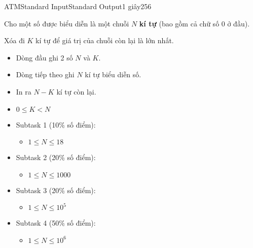 \documentclass[11pt,a4paper,oneside]{article}
\begin{document}
\begin{problem}{ATM}{Standard Input}{Standard Output}{1 giây}{256}

Cho một số được biểu diễn là một chuỗi $N$ \textbf{kí tự} (bao gồm cả chữ số 0 ở đầu). 

Xóa đi $K$ kí tự để giá trị của chuỗi còn lại là lớn nhất.

\InputFile

\begin{itemize}
	\item Dòng đầu ghi 2 số $N$ và $K$.
	\item Dòng tiếp theo ghi $N$ kí tự biểu diễn số.
\end{itemize}

\OutputFile

\begin{itemize}
	\item In ra $N - K$ kí tự còn lại.
\end{itemize}

\Constraints
\begin{itemize}
	\item $0 \le K < N$
	\item Subtask 1 (10\% số điểm):
	\begin{itemize}
		\item $1 \le N \le 18$
	\end{itemize}
	\item Subtask 2 (20\% số điểm):
	\begin{itemize}
		\item $1 \le N \le 1000$
	\end{itemize}
	\item Subtask 3 (20\% số điểm):
	\begin{itemize}
		\item $1 \le N \le 10^5$
	\end{itemize}
	\item Subtask 4 (50\% số điểm):
	\begin{itemize}
		\item $1 \le N \le 10^6$
	\end{itemize}
\end{itemize}

\Example

\begin{example}
%
%
\end{example}

\vspace{.5cm}

\end{problem}
\end{document}
